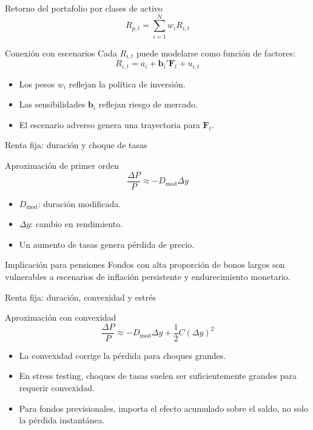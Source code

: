 \documentclass[aspectratio=169,11pt]{beamer}
\begin{document}
\begin{frame}{Retorno del portafolio por clases de activo}
\[
R_{p,t}=\sum_{i=1}^{N} w_i R_{i,t}
\]

\begin{block}{Conexión con escenarios}
Cada $R_{i,t}$ puede modelarse como función de factores:
\[
R_{i,t}=a_i+\bm{b}_i'\bm{F}_t+u_{i,t}
\]
\end{block}

\begin{itemize}
  \item Los pesos $w_i$ reflejan la política de inversión.
  \item Las sensibilidades $\bm{b}_i$ reflejan riesgo de mercado.
  \item El escenario adverso genera una trayectoria para $\bm{F}_t$.
\end{itemize}
\end{frame}

\begin{frame}{Renta fija: duración y choque de tasas}
\begin{block}{Aproximación de primer orden}
\[
\frac{\Delta P}{P}\approx -D_{\text{mod}}\Delta y
\]
\end{block}

\begin{itemize}
  \item $D_{\text{mod}}$: duración modificada.
  \item $\Delta y$: cambio en rendimiento.
  \item Un aumento de tasas genera pérdida de precio.
\end{itemize}

\begin{alertblock}{Implicación para pensiones}
Fondos con alta proporción de bonos largos son vulnerables a escenarios de inflación persistente y endurecimiento monetario.
\end{alertblock}
\end{frame}

\begin{frame}{Renta fija: duración, convexidad y estrés}
\begin{block}{Aproximación con convexidad}
\[
\frac{\Delta P}{P}\approx -D_{\text{mod}}\Delta y+\frac{1}{2}C(\Delta y)^2
\]
\end{block}

\begin{itemize}
  \item La convexidad corrige la pérdida para choques grandes.
  \item En stress testing, choques de tasas suelen ser suficientemente grandes para requerir convexidad.
  \item Para fondos previsionales, importa el efecto acumulado sobre el saldo, no solo la pérdida instantánea.
\end{itemize}
\end{frame}
\end{document}
